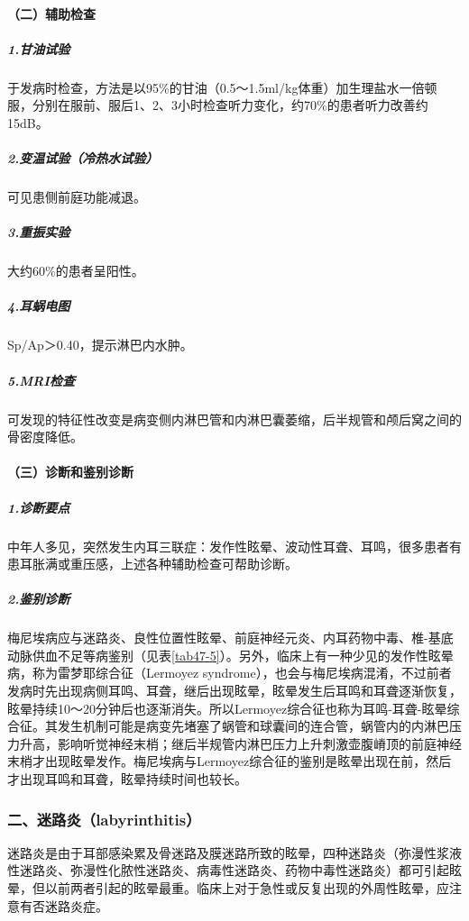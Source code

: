 \paragraph{（二）辅助检查}

\subparagraph{1.甘油试验}

于发病时检查，方法是以95\%的甘油（0.5～1.5ml/kg体重）加生理盐水一倍顿服，分别在服前、服后1、2、3小时检查听力变化，约70\%的患者听力改善约15dB。

\subparagraph{2.变温试验（冷热水试验）}

可见患侧前庭功能减退。

\subparagraph{3.重振实验}

大约60\%的患者呈阳性。

\subparagraph{4.耳蜗电图}

Sp/Ap＞0.40，提示淋巴内水肿。

\subparagraph{5.MRI检查}

可发现的特征性改变是病变侧内淋巴管和内淋巴囊萎缩，后半规管和颅后窝之间的骨密度降低。

\paragraph{（三）诊断和鉴别诊断}

\subparagraph{1.诊断要点}

中年人多见，突然发生内耳三联症：发作性眩晕、波动性耳聋、耳鸣，很多患者有患耳胀满或重压感，上述各种辅助检查可帮助诊断。

\subparagraph{2.鉴别诊断}

梅尼埃病应与迷路炎、良性位置性眩晕、前庭神经元炎、内耳药物中毒、椎-基底动脉供血不足等病鉴别（见表\ref{tab47-5}）。另外，临床上有一种少见的发作性眩晕病，称为雷梦耶综合征（Lermoyez
syndrome），也会与梅尼埃病混淆，不过前者发病时先出现病侧耳鸣、耳聋，继后出现眩晕，眩晕发生后耳鸣和耳聋逐渐恢复，眩晕持续10～20分钟后也逐渐消失。所以Lermoyez综合征也称为耳鸣-耳聋-眩晕综合征。其发生机制可能是病变先堵塞了蜗管和球囊间的连合管，蜗管内的内淋巴压力升高，影响听觉神经末梢；继后半规管内淋巴压力上升刺激壶腹嵴顶的前庭神经末梢才出现眩晕发作。梅尼埃病与Lermoyez综合征的鉴别是眩晕出现在前，然后才出现耳鸣和耳聋，眩晕持续时间也较长。

\subsubsection{二、迷路炎（labyrinthitis）}

迷路炎是由于耳部感染累及骨迷路及膜迷路所致的眩晕，四种迷路炎（弥漫性浆液性迷路炎、弥漫性化脓性迷路炎、病毒性迷路炎、药物中毒性迷路炎）都可引起眩晕，但以前两者引起的眩晕最重。临床上对于急性或反复出现的外周性眩晕，应注意有否迷路炎症。

